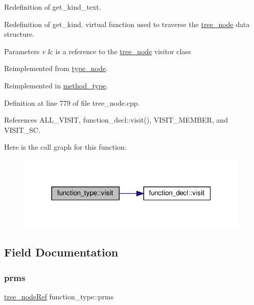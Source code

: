 Redefinition of get\+\_\+kind\+\_\+text. 

Redefinition of get\+\_\+kind. virtual function used to traverse the \hyperlink{classtree__node}{tree\+\_\+node} data structure. 
\begin{DoxyParams}{Parameters}
{\em v} & is a reference to the \hyperlink{classtree__node}{tree\+\_\+node} visitor class \\
\hline
\end{DoxyParams}


Reimplemented from \hyperlink{structtype__node_adc6e447af5f9505e6305320933c46a96}{type\+\_\+node}.



Reimplemented in \hyperlink{structmethod__type_a5994c05dca057b061c979293c5895c41}{method\+\_\+type}.



Definition at line 779 of file tree\+\_\+node.\+cpp.



References A\+L\+L\+\_\+\+V\+I\+S\+IT, function\+\_\+decl\+::visit(), V\+I\+S\+I\+T\+\_\+\+M\+E\+M\+B\+ER, and V\+I\+S\+I\+T\+\_\+\+SC.

Here is the call graph for this function\+:
\nopagebreak
\begin{figure}[H]
\begin{center}
\leavevmode
\includegraphics[width=313pt]{dd/d49/structfunction__type_a7cfe2e272e5280c9c280b180e3a21c2b_cgraph}
\end{center}
\end{figure}


\subsection{Field Documentation}
\mbox{\label{structfunction__type_aa866f49264d4ebe75f63ec0db068b4d2}} 
\subsubsection{\texorpdfstring{prms}{prms}}
{\footnotesize\ttfamily \hyperlink{tree__node_8hpp_a6ee377554d1c4871ad66a337eaa67fd5}{tree\+\_\+node\+Ref} function\+\_\+type\+::prms}



